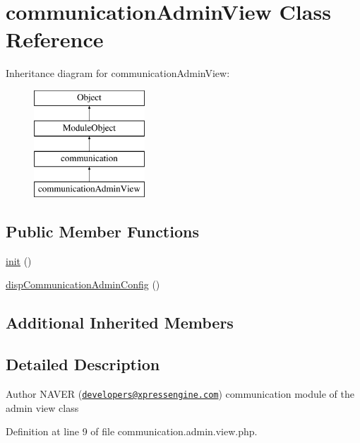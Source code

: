 \hypertarget{classcommunicationAdminView}{}\section{communication\+Admin\+View Class Reference}
\label{classcommunicationAdminView}
Inheritance diagram for communication\+Admin\+View\+:\begin{figure}[H]
\begin{center}
\leavevmode
\includegraphics[height=4.000000cm]{classcommunicationAdminView}
\end{center}
\end{figure}
\subsection*{Public Member Functions}
\begin{DoxyCompactItemize}
\item 
\hyperlink{classcommunicationAdminView_a75c54eb9cc38929b399c2e5aa600c979}{init} ()
\item 
\hyperlink{classcommunicationAdminView_a622dd5ee36cad7a2c2e9d9eea814b0eb}{disp\+Communication\+Admin\+Config} ()
\end{DoxyCompactItemize}
\subsection*{Additional Inherited Members}


\subsection{Detailed Description}
\begin{DoxyAuthor}{Author}
N\+A\+V\+ER (\href{mailto:developers@xpressengine.com}{\tt developers@xpressengine.\+com}) communication module of the admin view class 
\end{DoxyAuthor}


Definition at line 9 of file communication.\+admin.\+view.\+php.



